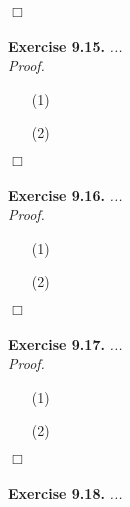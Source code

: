 \documentclass{article}
\begin{document}
$\Box$ \\\\






\textbf{Exercise 9.15.}
\emph{...} \\

\emph{Proof.}
\begin{enumerate}
\item[(1)]
\item[(2)]

\end{enumerate}
$\Box$ \\\\






\textbf{Exercise 9.16.}
\emph{...} \\

\emph{Proof.}
\begin{enumerate}
\item[(1)]
\item[(2)]

\end{enumerate}
$\Box$ \\\\






\textbf{Exercise 9.17.}
\emph{...} \\

\emph{Proof.}
\begin{enumerate}
\item[(1)]
\item[(2)]

\end{enumerate}
$\Box$ \\\\






\textbf{Exercise 9.18.}
\emph{...} \\
\end{document}
